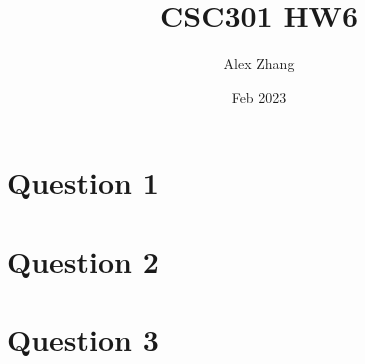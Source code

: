 \documentclass{article}
\title{CSC301 HW6}
\author{Alex Zhang}
\date{Feb 2023}
\begin{document}
\maketitle

\section*{Question 1}


\section*{Question 2}


\section*{Question 3}
\end{document}
